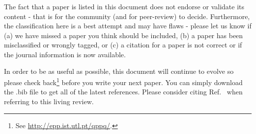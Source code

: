 \documentclass[12pt,letterpaper]{article}
\begin{document}
The fact that a paper is listed in this document does not endorse or validate its content - that is for the community (and for peer-review) to decide.  Furthermore, the classification here is a best attempt and may have flaws - please let us know if (a) we have missed a paper you think should be included, (b) a paper has been misclassified or wrongly tagged, or (c) a citation for a paper is not correct or if the journal information is now available.

In order to be as useful as possible, this document will continue to evolve so please check back\footnote{See \href{http://epp.ist.utl.pt/qppq/}{http://epp.ist.utl.pt/qppq/}.} before you write your next paper.  You can simply download the .bib file to get all of the latest references. Please consider citing Ref.~\cite{qppqlivingreview} when referring to this living review.
\end{document}
